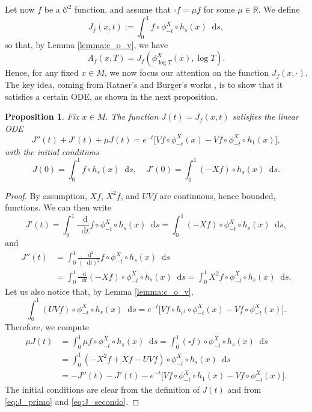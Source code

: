 \documentclass[10pt]{amsart}
\newcommand \R{\mathbb{R}}
\newcommand*{\diff}{\mathop{}\!\mathrm{d}}
\newcommand{\aver}[1]{A_{#1}(x,T)}
\newtheorem {proposition}[theorem]{Proposition}
\theoremstyle{definition}
\begin{document}
Let now $f$ be a $\mathscr{C}^2$ function, and assume that $\square f = \mu f$ for some $\mu \in \R$.
We define
\[
J_f(x,t) := \int_0^1 f \circ \phi^X_{-t}\circ h_s(x) \diff s,
\]
so that, by Lemma \ref{lemma:c_o_v}, we have
\begin{equation}\label{eq:aver_equals_I}
\aver{f} = J_f(\phi^X_{\log T}(x), \log T).
\end{equation}
Hence, for any fixed $x \in M$, we now focus our attention on the function $J_f(x, \cdot)$.
The key idea, coming from Ratner's and Burger's works \cite{Rat1, Bur}, is to show that it satisfies a certain ODE, as shown in the next proposition.

\begin{proposition}\label{thm:eq_diff}
Fix $x \in M$. The function $J(t) = J_f(x,t) $ satisfies the linear ODE
\begin{equation*}
J''(t)+J'(t)+ \mu J(t) = e^{-t} \bigl[ Vf \circ \phi^X_{-t}(x) - Vf \circ \phi^X_{-t} \circ h_1(x) \bigr],
\end{equation*}
with the initial conditions
\[
J(0) = \int_0^1 f \circ h_s(x) \diff s,\ \ \ \ \ J'(0) = \int_0^1 (-Xf) \circ h_s(x) \diff s.
\]
\end{proposition}
\begin{proof}
By assumption, $Xf$, $X^2f$, and $UVf$ are continuous, hence bounded, functions.
We can then write
\begin{equation}\label{eq:J_primo}
J'(t) = \int_0^1 \frac{\diff}{\diff t} f\circ \phi^X_{-t}\circ h_s(x) \diff s = \int_0^1 (-Xf) \circ \phi^X_{-t}\circ h_s(x) \diff s,
\end{equation}
and
\begin{equation}\label{eq:J_secondo}
\begin{split}
J''(t) &= \int_0^1 \frac{\diff^2}{(\diff t)^2} f\circ \phi^X_{-t}\circ h_s(x) \diff s\\
&= \int_0^1 \frac{\diff}{\diff t} (-Xf)\circ \phi^X_{-t}\circ h_s(x) \diff s = \int_0^1 X^2f \circ \phi^X_{-t}\circ h_s(x) \diff s.
\end{split}
\end{equation}
Let us also notice that, by Lemma \ref{lemma:c_o_v},
\[
\int_0^1 (UVf) \circ \phi^X_{-t}\circ h_s(x) \diff s = e^{-t}\bigl[ Vf\circ h_{e^t} \circ \phi^X_{-t}(x) - Vf \circ \phi^X_{-t}(x)\bigr].
\]
Therefore, we compute
\begin{equation*}
\begin{split}
\mu J(t) &= \int_0^1 \mu f \circ \phi^X_{-t}\circ h_s(x) \diff s = \int_0^1 (\square f) \circ \phi^X_{-t}\circ h_s(x) \diff s \\
&= \int_0^1 (-X^2f+Xf -UVf) \circ \phi^X_{-t}\circ h_s(x) \diff s \\
&= - J''(t) -J'(t) - e^{-t}\bigl[ Vf \circ \phi^X_{-t}\circ h_{1}(x) - Vf \circ \phi^X_{-t}(x)\bigr].
\end{split}
\end{equation*}
The initial conditions are clear from the definition of $J(t)$ and from \eqref{eq:J_primo} and \eqref{eq:J_secondo}.
\end{proof}
\end{document}
